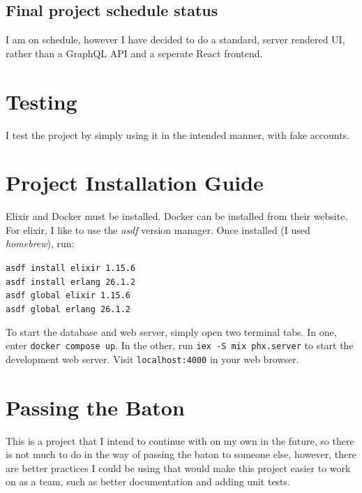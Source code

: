 \documentclass[12pt, a4paper,oneside]{book}
\numberwithin{equation}{section}
\begin{document}
\section{Final project schedule status}\label{sec:3.2}
I am on schedule, however I have decided to do a standard, server rendered UI,
rather than a GraphQL API and a seperate React frontend.


\chapter{Testing}
I test the project by simply using it in the intended manner, with fake accounts.

\chapter{Project Installation Guide}
Elixir and Docker must be installed. Docker can be installed from their website. For elixir, I like to use the {\em asdf} version manager.
Once installed (I used {\em homebrew}), run:
\begin{center}
  \texttt{asdf install elixir 1.15.6}\\
  \texttt{asdf install erlang 26.1.2}\\
  \texttt{asdf global elixir 1.15.6}\\
  \texttt{asdf global erlang 26.1.2}
\end{center}
To start the database and web server, simply open two terminal tabs. In one, enter \texttt{docker compose up}.
In the other, run \texttt{iex -S mix phx.server} to start the development web server.
Visit \texttt{localhost:4000} in your web browser. 

\chapter{Passing the Baton}
This is a project that I intend to continue with on my own in the future, 
so there is not much to do in the way of passing the baton to someone else,
however, there are better practices I could be using that would make this project 
easier to work on as a team, such as better documentation and adding unit tests.
\end{document}
